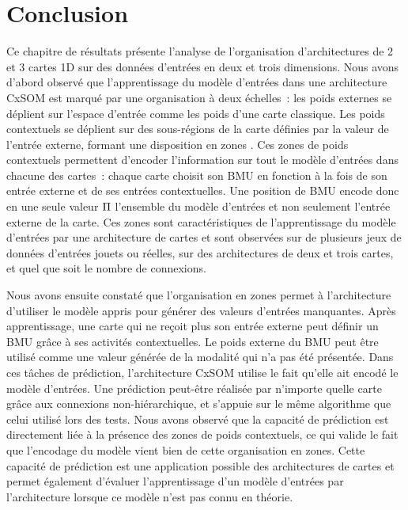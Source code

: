 \documentclass[../main]{subfiles}
\begin{document}
\section{Conclusion}

Ce chapitre de résultats présente l'analyse de l'organisation d'architectures de 2 et 3 cartes 1D sur des données d'entrées en deux et trois dimensions.
Nous avons d'abord observé que l'apprentissage du modèle d'entrées dans une architecture CxSOM est marqué par une organisation à deux échelles~: les poids externes se déplient sur l'espace d'entrée comme les poids d'une carte classique. Les poids contextuels se déplient sur des sous-régions de la carte définies par la valeur de l'entrée externe, formant une disposition en \og zones \fg{}.
Ces zones de poids contextuels permettent d'encoder l'information sur tout le modèle d'entrées dans chacune des cartes~: 
chaque carte choisit son BMU en fonction à la fois de son entrée externe et de ses entrées contextuelles. Une position de BMU encode donc en une seule valeur $\Pi$ l'ensemble du modèle d'entrées et non seulement l'entrée externe de la carte.
Ces zones sont caractéristiques de l'apprentissage du modèle d'entrées par une architecture de cartes et sont observées sur de plusieurs jeux de données d'entrées jouets ou réelles, sur des architectures de deux et trois cartes, et quel que soit le nombre de connexions.

Nous avons ensuite constaté que l'organisation en zones permet à l'architecture d'utiliser le modèle appris pour générer des valeurs d'entrées manquantes.
Après apprentissage, une carte qui ne reçoit plus son entrée externe peut définir un BMU grâce à ses activités contextuelles.
Le poids externe du BMU peut être utilisé comme une valeur générée de la modalité qui n'a pas été présentée.
Dans ces tâches de prédiction, l'architecture CxSOM utilise le fait qu'elle ait encodé le modèle d'entrées. Une prédiction peut-être réalisée par n'importe quelle carte grâce aux connexions non-hiérarchique, et s'appuie sur le même algorithme que celui utilisé lors des tests.
Nous avons observé que la capacité de prédiction est directement liée à la présence des zones de poids contextuels, ce qui valide le fait que l'encodage du modèle vient bien de cette organisation en zones.
Cette capacité de prédiction est une application possible des architectures de cartes et permet également d'évaluer l'apprentissage d'un modèle d'entrées par l'architecture lorsque ce modèle n'est pas connu en théorie.
\end{document}
